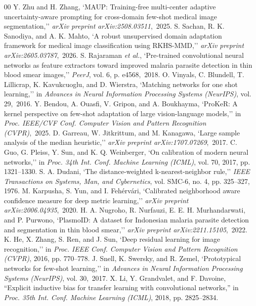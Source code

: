 \documentclass[conference]{IEEEtran}
\renewcommand{\headrulewidth}{0.5pt}
\begin{document}
\begin{thebibliography}{00}
 Y. Zhu and H. Zhang, `MAUP: Training-free multi-center adaptive uncertainty-aware prompting for cross-domain few-shot medical image segmentation,'' \textit{arXiv preprint arXiv:2508.03511},~2025.
 S. Sachan, R. K. Sanodiya, and A. K. Mahto, `A robust unsupervised domain adaptation framework for medical image classification using RKHS-MMD,'' \textit{arXiv preprint arXiv:2605.03787},~2026.
 S. Rajaraman \textit{et al.}, `Pre-trained convolutional neural networks as feature extractors toward improved malaria parasite detection in thin blood smear images,'' \textit{PeerJ}, vol. 6, p. e4568,~2018.
 O. Vinyals, C. Blundell, T. Lillicrap, K. Kavukcuoglu, and D. Wierstra, `Matching networks for one shot learning,'' in \textit{Advances in Neural Information Processing Systems (NeurIPS)}, vol. 29,~2016.
 Y. Bendou, A. Ouasfi, V. Gripon, and A. Boukhayma, `ProKeR: A kernel perspective on few-shot adaptation of large vision-language models,'' in \textit{Proc. IEEE/CVF Conf. Computer Vision and Pattern Recognition (CVPR)},~2025.
 D. Garreau, W. Jitkrittum, and M. Kanagawa, `Large sample analysis of the median heuristic,'' \textit{arXiv preprint arXiv:1707.07269},~2017.
 C. Guo, G. Pleiss, Y. Sun, and K. Q. Weinberger, `On calibration of modern neural networks,'' in \textit{Proc. 34th Int. Conf. Machine Learning (ICML)}, vol. 70, 2017, pp. 1321--1330.
 S. A. Dudani, `The distance-weighted k-nearest-neighbor rule,'' \textit{IEEE Transactions on Systems, Man, and Cybernetics}, vol. SMC-6, no. 4, pp. 325--327, 1976.
 M. Karpusha, S. Yun, and I. Fehérvári, `Calibrated neighborhood aware confidence measure for deep metric learning,'' \textit{arXiv preprint arXiv:2006.04935},~2020.
 H. A. Nugroho, R. Nurfauzi, E. E. H. Murhandarwati, and P. Purwono, `PlasmoID: A dataset for Indonesian malaria parasite detection and segmentation in thin blood smear,'' \textit{arXiv preprint arXiv:2211.15105},~2022.
 K. He, X. Zhang, S. Ren, and J. Sun, `Deep residual learning for image recognition,'' in \textit{Proc. IEEE Conf. Computer Vision and Pattern Recognition (CVPR)}, 2016, pp. 770--778.
 J. Snell, K. Swersky, and R. Zemel, `Prototypical networks for few-shot learning,'' in \textit{Advances in Neural Information Processing Systems (NeurIPS)}, vol. 30,~2017.
 X. Li, Y. Grandvalet, and F. Davoine, ``Explicit inductive bias for transfer learning with convolutional networks,'' in \textit{Proc. 35th Int. Conf. Machine Learning (ICML)}, 2018, pp. 2825--2834.
\end{thebibliography}

\clearpage
\onecolumn
\fancyhf{}
\renewcommand{\headrulewidth}{0pt}




\end{document}
